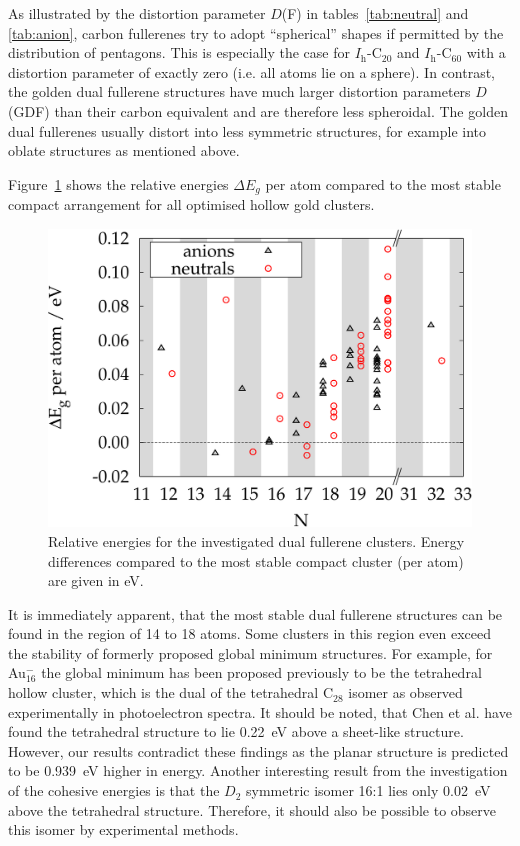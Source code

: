 As illustrated by the distortion parameter $D$(F) in tables~\ref{tab:neutral}
and \ref{tab:anion}, carbon fullerenes try to adopt ``spherical'' shapes if
permitted by the distribution of pentagons. This is especially the case for
$I_\mathrm{h}$-C$_{20}$ and $I_\mathrm{h}$-C$_{60}$ with a distortion parameter
of exactly zero (i.e. all atoms lie on a sphere).  In contrast, the golden dual
fullerene structures have much larger distortion parameters $D$(GDF) than their
carbon equivalent and are therefore less spheroidal. The golden dual fullerenes
usually distort into less symmetric structures, for example into oblate
structures as mentioned above.

Figure~\ref{fig:AunMinus2} shows the relative energies $\Delta E_g$ per atom
compared to the most stable compact arrangement for all optimised hollow gold
clusters.
%
\begin{figure}[htbp]
    \begin{center}
    \includegraphics[width=.8\textwidth]{golddual/energies.pdf}
    \caption{Relative energies for the investigated dual fullerene clusters.
    Energy differences compared to the most stable compact cluster (per atom) are given in eV.}
    \label{fig:AunMinus2}
    \end{center}
\end{figure}
%
It is immediately apparent, that the most stable dual fullerene structures can
be found in the region of 14 to 18 atoms. Some clusters in this region even
exceed the stability of formerly proposed global minimum structures. For
example, for Au$_{16}^-$ the global minimum has been proposed previously to be
the tetrahedral hollow
cluster,\autocite{Schooss_Determiningsizedependentstructure_2010,Lechtken_Structuredeterminationgold_2009}
which is the dual of the tetrahedral C$_{28}$ isomer as observed experimentally
in photoelectron spectra.\autocite{Bulusu_Evidencehollowgolden_2006} It should
be noted, that Chen et al. have found the tetrahedral structure to lie 0.22~eV
above a sheet-like structure.\autocite{Chen_Structuresneutralanionic_2010}
However, our results contradict these findings as the planar structure is
predicted to be 0.939~eV higher in energy. Another interesting result from the
investigation of the cohesive energies is that the $D_\mathrm{2}$ symmetric
isomer 16:1 lies only 0.02~eV above the tetrahedral structure. Therefore, it
should also be possible to observe this isomer by experimental methods.

